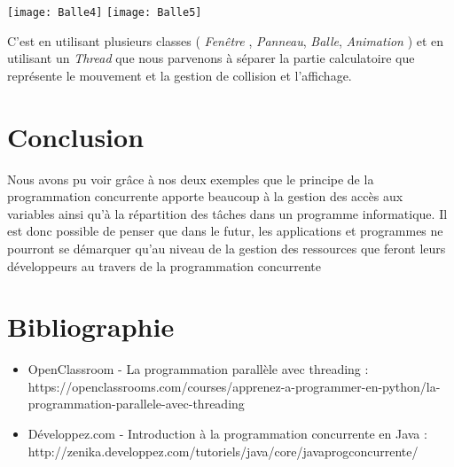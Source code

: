 \documentclass{article}
\begin{document}
\begin{center}
\texttt{[image: Balle4]} \texttt{[image: Balle5]} 
\end{center}

C'est en utilisant plusieurs classes ( \textit{Fen\^{e}tre} , \textit{Panneau}, \textit{Balle}, \textit{Animation} ) et en utilisant un \textit{Thread} que nous parvenons \`{a} s\'{e}parer la partie calculatoire que repr\'{e}sente le mouvement et la gestion de collision et l'affichage.

\section{Conclusion}

Nous avons pu voir gr\^{a}ce \`{a} nos deux exemples que le principe de la programmation concurrente apporte beaucoup \`{a} la gestion des acc\`{e}s aux variables ainsi qu'\`{a} la r\'{e}partition des t\^{a}ches dans un programme informatique. Il est donc possible de penser que dans le futur, les applications et programmes ne pourront se d\'{e}marquer qu'au niveau de la gestion des ressources que feront leurs d\'{e}veloppeurs au travers de la programmation concurrente

\section{Bibliographie}
\begin{itemize}
\item OpenClassroom - La programmation parall\`{e}le avec threading : https://openclassrooms.com/courses/apprenez-a-programmer-en-python/la-programmation-parallele-avec-threading
\item D\'{e}veloppez.com - Introduction \`{a} la programmation concurrente en Java : http://zenika.developpez.com/tutoriels/java/core/javaprogconcurrente/ 
\end{itemize}
\end{document}
